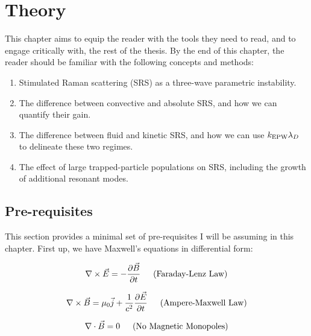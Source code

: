 \chapter{Theory}
\label{chp:theory}

This chapter aims to equip the reader with the tools they need to read, and to engage critically with, the rest of the thesis. By the end of this chapter, the reader should be familiar with the following concepts and methods:
\begin{enumerate}
	\item Stimulated Raman scattering (\acrshort{SRS}) as a three-wave parametric instability.
	\item The difference between convective and absolute SRS, and how we can quantify their gain.
	\item The difference between fluid and kinetic SRS, and how we can use $k_\mathrm{EPW}\lambda_D$ to delineate these two regimes.
	\item The effect of large trapped-particle populations on SRS, including the growth of additional resonant modes.
\end{enumerate}


\section{Pre-requisites}
This section provides a minimal set of pre-requisites I will be assuming in this chapter. First up, we have Maxwell's equations in differential form:



\begin{equation}
\nabla \times \vec{E}=-\frac{\partial \vec{B}}{\partial t} \text{\,\,\,\,\,\,\,\,\,(Faraday-Lenz Law)}
\end{equation}

\begin{equation}
\nabla \times \vec{B}=\mu_{0} \vec{j}+\frac{1}{c^{2}} \frac{\partial \vec{E}}{\partial t}
\text{\,\,\,\,\,\,\,\,\,(Ampere-Maxwell Law)}
\end{equation}

\begin{equation}
\nabla \cdot \vec{B}=0 \text{\,\,\,\,\,\,\,\,\,(No Magnetic Monopoles)}
\end{equation}

